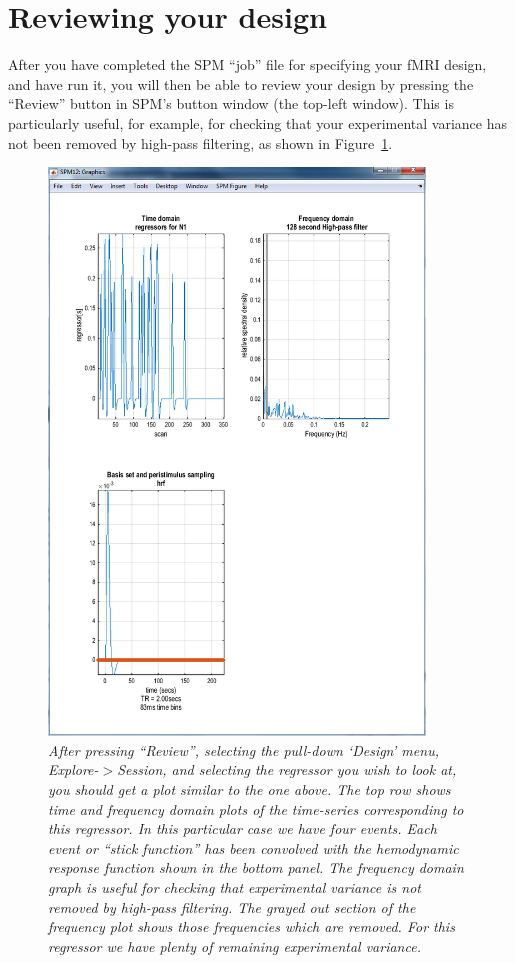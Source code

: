 \section{Reviewing your design \label{explore}}

After you have completed the SPM ``job'' file for specifying your fMRI design, and have run it, you will then be able to review your design by pressing the ``Review'' button in SPM's button window (the top-left window). This is particularly useful, for example, for checking that your experimental variance has not been removed by high-pass filtering, as shown in Figure~\ref{rev4}.

\begin{figure}
\begin{center}
\includegraphics[width=100mm]{fmri_spec/reg4}
\end{center}
\caption{\em After pressing ``Review'', selecting the pull-down `Design' menu, Explore-$>$Session, and selecting the regressor you wish to look at, you should get a plot similar to the one above. The top row shows time and frequency domain plots of the time-series corresponding to this regressor. In this particular case we have four events. Each event or ``stick function'' has been convolved with the hemodynamic response function shown in the bottom panel. The frequency domain graph is useful for checking that experimental variance is not removed by high-pass filtering. The grayed out section of the frequency plot shows those frequencies which are removed. For this regressor we have plenty of remaining experimental variance. \label{rev4}}
\end{figure}
